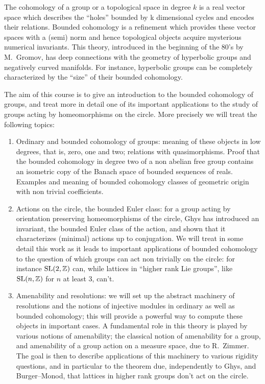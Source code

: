 \documentclass[a4paper]{article}
\begin{document}
\maketitle
{\small
\setlength{\parindent}{0em}
\setlength{\parskip}{1em}

The cohomology of a group or a topological space in degree $k$ is a real vector space which describes the ``holes'' bounded by k dimensional cycles and encodes their relations. Bounded cohomology is a refinement which provides these vector spaces with a (semi) norm and hence topological objects acquire mysterious numerical invariants. This theory, introduced in the beginning of the 80's by M.\ Gromov, has deep connections with the geometry of hyperbolic groups and negatively curved manifolds. For instance, hyperbolic groups can be completely characterized by the ``size'' of their bounded cohomology.

The aim of this course is to give an introduction to the bounded cohomology of groups, and treat more in detail one of its important applications to the study of groups acting by homeomorphisms on the circle. More precisely we will treat the following topics:
\begin{enumerate}
  \item Ordinary and bounded cohomology of groups: meaning of these objects in low degrees, that is, zero, one and two; relations with quasimorphisms. Proof that the bounded cohomology in degree two of a non abelian free group contains an isometric copy of the Banach space of bounded sequences of reals. Examples and meaning of bounded cohomology classes of geometric origin with non trivial coefficients.

  \item Actions on the circle, the bounded Euler class: for a group acting by orientation preserving homeomorphisms of the circle, Ghys has introduced an invariant, the bounded Euler class of the action, and shown that it characterizes (minimal) actions up to conjugation. We will treat in some detail this work as it leads to important applications of bounded cohomology to the question of which groups can act non trivially on the circle: for instance $\mathrm{SL}(2,\mathbb{Z})$ can, while lattices in ``higher rank Lie groups'', like $\mathrm{SL}(n,\mathbb{Z})$ for $n$ at least $3$, can't.

  \item Amenability and resolutions: we will set up the abstract machinery of resolutions and the notions of injective modules in ordinary as well as bounded cohomology; this will provide a powerful way to compute these objects in important cases. A fundamental role in this theory is played by various notions of amenability; the classical notion of amenability for a group, and amenability of a group action on a measure space, due to R.\ Zimmer. The goal is then to describe applications of this machinery to various rigidity questions, and in particular to the theorem due, independently to Ghys, and Burger--Monod, that lattices in higher rank groups don't act on the circle.
\end{enumerate}

}
\end{document}
